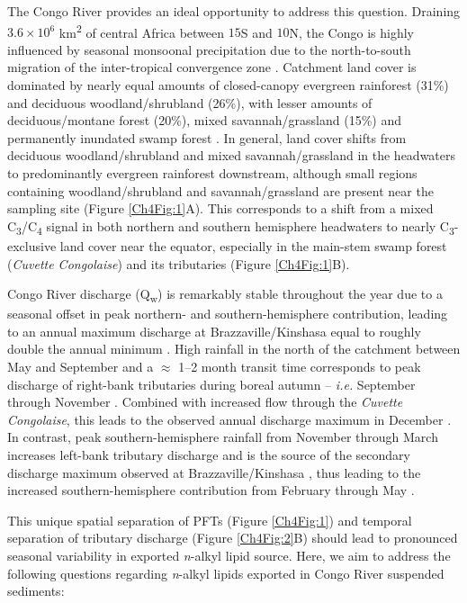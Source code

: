 The Congo River provides an ideal opportunity to address this question. Draining $3.6 \times 10^6$ km\textsuperscript{2} of central Africa between $15$\textdegree S and $10$\textdegree N, the Congo is highly influenced by seasonal monsoonal precipitation due to the north-to-south migration of the inter-tropical convergence zone \citep[ITCZ;][]{Gasse:2000ul}. Catchment land cover is dominated by nearly equal amounts of closed-canopy evergreen rainforest (31\%) and deciduous woodland/shrubland (26\%), with lesser amounts of deciduous/montane forest (20\%), mixed savannah/grassland (15\%) and permanently inundated swamp forest \citep[4\%;][]{Mayaux:2004uw,Still:2010wh}. In general, land cover shifts from deciduous woodland/shrubland and mixed savannah/grassland in the headwaters to predominantly evergreen rainforest downstream, although small regions containing woodland/shrubland and savannah/grassland are present near the sampling site (Figure \ref{Ch4Fig:1}A). This corresponds to a shift from a mixed C\textsubscript{3}/C\textsubscript{4} signal in both northern and southern hemisphere headwaters to nearly C\textsubscript{3}-exclusive land cover near the equator, especially in the main-stem swamp forest (\textit{Cuvette Congolaise}) and its tributaries (Figure \ref{Ch4Fig:1}B).

Congo River discharge (Q\textsubscript{w}) is remarkably stable throughout the year due to a seasonal offset in peak northern- and southern-hemisphere contribution, leading to an annual maximum discharge at Brazzaville/Kinshasa equal to roughly double the annual minimum \citep{Coynel:2005cn,Spencer:2014vp}. High rainfall in the north of the catchment between May and September and a $\approx$ 1--2 month transit time corresponds to peak discharge of right-bank tributaries during boreal autumn -- \textit{i.e.} September through November \citep{Bricquet:1993ve,Mahe:1993wu}. Combined with increased flow through the \textit{Cuvette Congolaise}, this leads to the observed annual discharge maximum in December \citep[Figure \ref{Ch4Fig:2}A;][]{Bricquet:1993ve}. In contrast, peak southern-hemisphere rainfall from November through March increases left-bank tributary discharge and is the source of the secondary discharge maximum observed at Brazzaville/Kinshasa \citep[Figure \ref{Ch4Fig:2}A;][]{Bricquet:1993ve,Mahe:1993wu}, thus leading to the increased southern-hemisphere contribution from February through May \citep[Figure \ref{Ch4Fig:2}B;][]{Bricquet:1993ve}.

This unique spatial separation of PFTs (Figure \ref{Ch4Fig:1}) and temporal separation of tributary discharge (Figure \ref{Ch4Fig:2}B) should lead to pronounced seasonal variability in exported \textit{n}-alkyl lipid source. Here, we aim to address the following questions regarding \textit{n}-alkyl lipids exported in Congo River suspended sediments: 

